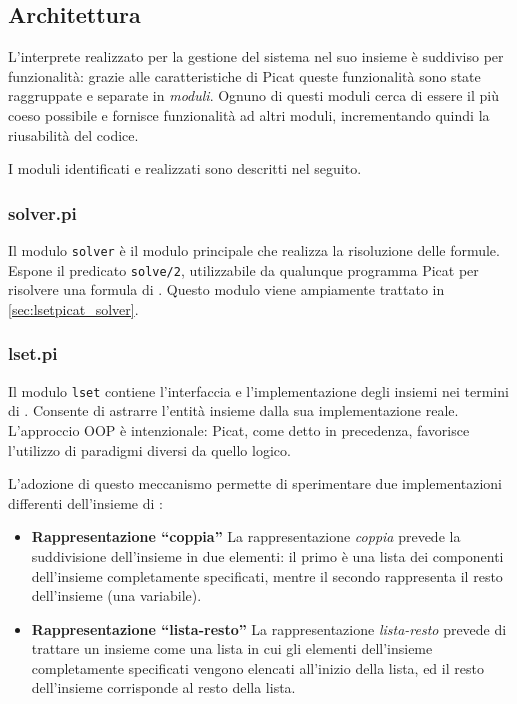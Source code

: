 \documentclass[12pt,a4paper,openright]{book}  %
\begin{document}
\subsection{Architettura}
\label{subsec:lsetpicat_architecture}

L'interprete realizzato per la gestione del sistema nel suo insieme è
suddiviso per funzionalità: grazie alle caratteristiche di Picat
queste funzionalità sono state raggruppate e separate in
\emph{moduli}. Ognuno di questi moduli cerca di essere il più coeso
possibile e fornisce funzionalità ad altri moduli, incrementando
quindi la riusabilità del codice.

I moduli identificati e realizzati sono descritti nel seguito.

\subsubsection{solver.pi}

Il modulo \texttt{solver} è il modulo principale che realizza la
risoluzione delle formule. Espone il predicato \verb|solve/2|,
utilizzabile da qualunque programma Picat per risolvere una formula di
\lset{}. Questo modulo viene ampiamente trattato in
\ref{sec:lsetpicat_solver}.

\subsubsection{lset.pi}

Il modulo \texttt{lset} contiene l'interfaccia e l'implementazione
degli insiemi nei termini di \lset{}. Consente di astrarre l'entità
insieme dalla sua implementazione reale. L'approccio OOP è
intenzionale: Picat, come detto in precedenza, favorisce l'utilizzo di
paradigmi diversi da quello logico.

L'adozione di questo meccanismo permette di sperimentare due
implementazioni differenti dell'insieme di \lset{}:

\begin{itemize}
	\item \textbf{Rappresentazione ``coppia''} La rappresentazione
          \emph{coppia} prevede la suddivisione dell'insieme in due
          elementi: il primo è una lista dei componenti dell'insieme
          completamente specificati, mentre il secondo rappresenta il
          resto dell'insieme (una variabile).
	\item \textbf{Rappresentazione ``lista-resto''} La
          rappresentazione \emph{lista-resto} prevede di trattare un
          insieme come una lista in cui gli elementi dell'insieme
          completamente specificati vengono elencati all'inizio della
          lista, ed il resto dell'insieme corrisponde al resto della
          lista.
\end{itemize}
\end{document}
